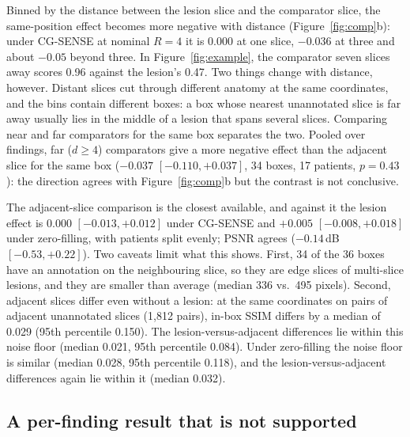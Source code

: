 \documentclass[letterpaper]{article} %
\begin{document}
Binned by the distance between the lesion slice and the comparator slice, the
same-position effect becomes more negative with distance
(Figure~\ref{fig:comp}b): under CG-SENSE at nominal $R=4$ it is $0.000$ at
one slice, $-0.036$ at three and about $-0.05$ beyond three. In
Figure~\ref{fig:example}, the comparator seven slices away scores 0.96
against the lesion's 0.47. Two things change with distance, however. Distant
slices cut through different anatomy at the same coordinates, and the bins
contain different boxes: a box whose nearest unannotated slice is far away
usually lies in the middle of a lesion that spans several slices. Comparing
near and far comparators for the same box separates the two. Pooled over
findings, far ($d\ge4$) comparators give a more negative effect than the
adjacent slice for the same box ($-0.037$ $[-0.110, +0.037]$, 34 boxes, 17
patients, $p=0.43$): the direction agrees with Figure~\ref{fig:comp}b but the
contrast is not conclusive.

The adjacent-slice comparison is the closest available, and against it the
lesion effect is $0.000$ $[-0.013, +0.012]$ under CG-SENSE and $+0.005$
$[-0.008, +0.018]$ under zero-filling, with patients split evenly; PSNR
agrees ($-0.14$\,dB $[-0.53, +0.22]$). Two caveats limit what this shows.
First, 34 of the 36 boxes have an annotation on the neighbouring slice, so
they are edge slices of multi-slice lesions, and they are smaller than average
(median 336 vs.\ 495 pixels). Second, adjacent slices differ even without a
lesion: at the same coordinates on pairs of adjacent unannotated slices
(1{,}812 pairs), in-box SSIM differs by a median of 0.029 (95th percentile
0.150). The lesion-versus-adjacent differences lie within this noise floor
(median 0.021, 95th percentile 0.084). Under zero-filling the noise floor is
similar (median 0.028, 95th percentile 0.118), and the lesion-versus-adjacent
differences again lie within it (median 0.032).

\subsection{A per-finding result that is not supported}
\end{document}
